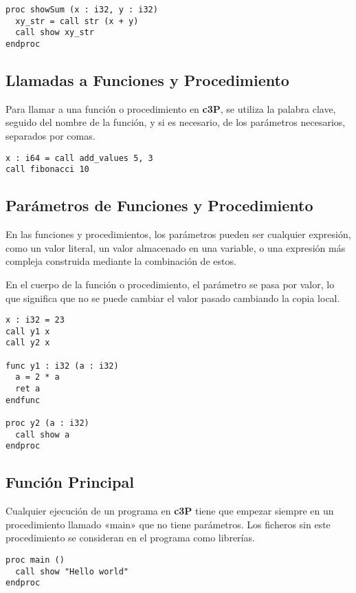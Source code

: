 \begin{verbatim}
proc showSum (x : i32, y : i32)
  xy_str = call str (x + y)
  call show xy_str
endproc
\end{verbatim}

\subsection{Llamadas a Funciones y Procedimiento}

Para llamar a una función o procedimiento en \textbf{c3P}, se utiliza la palabra clave,
seguido del nombre de la función, y si es necesario, de los parámetros necesarios, separados
por comas.

\begin{verbatim}
x : i64 = call add_values 5, 3
call fibonacci 10
\end{verbatim}

\subsection{Parámetros de Funciones y Procedimiento}

En las funciones y procedimientos, los parámetros pueden ser cualquier expresión, como
un valor literal, un valor almacenado en una variable, o una expresión más compleja
construida mediante la combinación de estos.

En el cuerpo de la función o procedimiento, el parámetro se pasa por valor, lo que
significa que no se puede cambiar el valor pasado cambiando la copia local.

\begin{verbatim}
x : i32 = 23
call y1 x
call y2 x

func y1 : i32 (a : i32)
  a = 2 * a
  ret a
endfunc

proc y2 (a : i32)
  call show a
endproc
\end{verbatim}

\subsection{Función Principal}

Cualquier ejecución de un programa en \textbf{c3P} tiene que empezar siempre en
un procedimiento llamado «main» que no tiene parámetros. Los ficheros sin este
procedimiento se consideran en el programa como librerías.

\begin{verbatim}
proc main ()
  call show "Hello world"
endproc
\end{verbatim}

